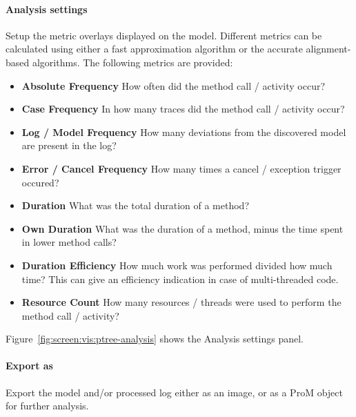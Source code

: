 \documentclass{article}
\begin{document}
\paragraph{Analysis settings}
Setup the metric overlays displayed on the model.
Different metrics can be calculated using either a fast approximation algorithm or the accurate alignment-based algorithms.
The following metrics are provided:
\begin{itemize}
    \item \textbf{Absolute Frequency} How often did the method call / activity occur?
    \item \textbf{Case Frequency} In how many traces did the method call / activity occur?
    \item \textbf{Log / Model Frequency} How many deviations from the discovered model are present in the log?
    \item \textbf{Error / Cancel Frequency} How many times a cancel / exception trigger occured?
    \item \textbf{Duration} What was the total duration of a method?
    \item \textbf{Own Duration} What was the duration of a method, minus the time spent in lower method calls?
    \item \textbf{Duration Efficiency} How much work was performed divided how much time? This can give an efficiency indication in case of multi-threaded code.
    \item \textbf{Resource Count} How many resources / threads were used to perform the method call / activity?
\end{itemize}
Figure~\ref{fig:screen:vis:ptree-analysis} shows the Analysis settings panel.

\paragraph{Export as}
Export the model and/or processed log either as an image, or as a ProM object for further analysis. 
\end{document}
